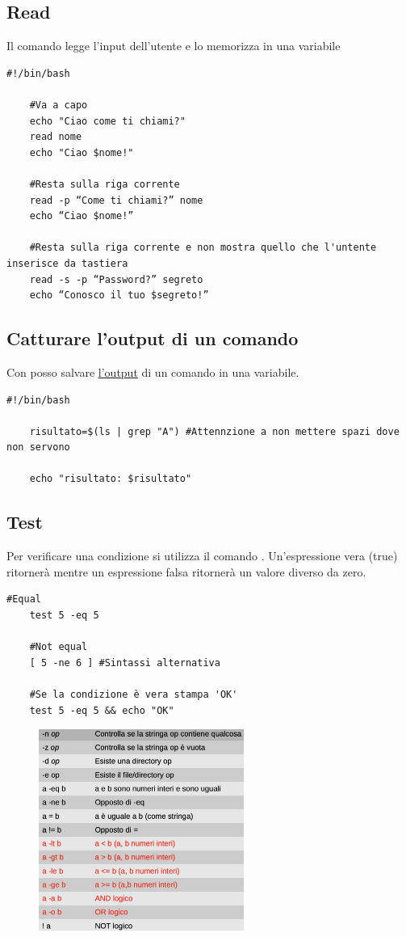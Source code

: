 \documentclass[../main.tex]{subfiles}
\begin{document}
\vspace{1cm}
\subsection{Read}
Il comando  legge l'input dell'utente e lo memorizza in una variabile
\begin{lstlisting}[style=bash]
    #!/bin/bash

    #Va a capo
    echo "Ciao come ti chiami?"
    read nome
    echo "Ciao $nome!"

    #Resta sulla riga corrente
    read -p “Come ti chiami?” nome
    echo “Ciao $nome!”

    #Resta sulla riga corrente e non mostra quello che l'untente inserisce da tastiera
    read -s -p “Password?” segreto
    echo “Conosco il tuo $segreto!”
\end{lstlisting}

\vspace{1cm}
\subsection{Catturare l'output di un comando}
Con \code{\$()} posso salvare \underline{l'output} di un comando in una variabile.
\begin{lstlisting}[style=bash]
    #!/bin/bash

    risultato=$(ls | grep "A") #Attennzione a non mettere spazi dove non servono

    echo "risultato: $risultato"
\end{lstlisting}

\pagebreak
\subsection{Test}
Per verificare una condizione si utilizza il comando . Un'espressione vera (true) ritornerà  mentre un espressione falsa
ritornerà un valore diverso da zero.
\begin{lstlisting}[style=bash]
    #Equal
    test 5 -eq 5

    #Not equal
    [ 5 -ne 6 ] #Sintassi alternativa

    #Se la condizione è vera stampa 'OK'
    test 5 -eq 5 && echo "OK"
\end{lstlisting}
\begin{figure}[h]
    \centering
    \includegraphics[width=0.6\textwidth]{../images/operatori.png}
\end{figure}
\end{document}
